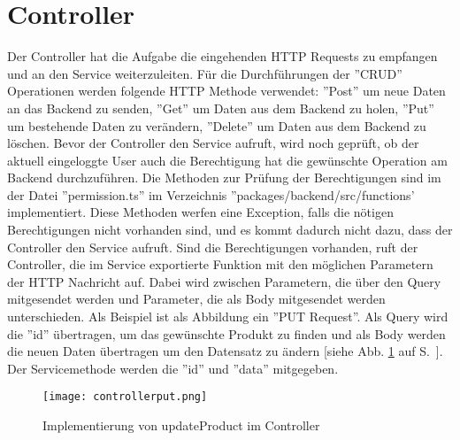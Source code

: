\section{Controller}
Der Controller hat die Aufgabe die eingehenden HTTP Requests zu empfangen und an den Service weiterzuleiten. Für die Durchführungen der ''CRUD'' Operationen werden folgende HTTP Methode verwendet:  ''Post'' um neue Daten an das Backend zu senden, ''Get'' um Daten aus dem Backend zu holen, ''Put'' um bestehende Daten zu verändern, ''Delete'' um Daten aus dem Backend zu löschen. Bevor der Controller den Service aufruft, wird noch geprüft, ob der aktuell eingeloggte User auch die Berechtigung hat die gewünschte Operation am Backend durchzuführen. Die Methoden zur Prüfung der Berechtigungen sind im der Datei ''permission.ts'' im Verzeichnis ''packages/backend/src/functions' implementiert. Diese Methoden werfen eine Exception, falls die nötigen Berechtigungen nicht vorhanden sind, und es kommt dadurch nicht dazu, dass der Controller den Service aufruft. Sind die Berechtigungen vorhanden, ruft der Controller, die im Service exportierte Funktion mit den möglichen Parametern der HTTP Nachricht auf. Dabei wird zwischen Parametern, die über den Query mitgesendet werden und Parameter, die als Body mitgesendet werden unterschieden. Als Beispiel ist als Abbildung ein ''PUT Request''. Als Query wird die ''id'' übertragen, um das gewünschte Produkt zu finden und als Body werden die neuen Daten übertragen um den Datensatz zu ändern [siehe Abb. \ref{fig: controllerput} auf S.~\pageref{fig: controllerput}]. Der Servicemethode werden die ''id'' und ''data'' mitgegeben.

\begin{figure}[h]
    \centering
    \texttt{[image: controllerput.png]}
    \caption{Implementierung von updateProduct im Controller}
    \label{fig: controllerput}
\end{figure}

